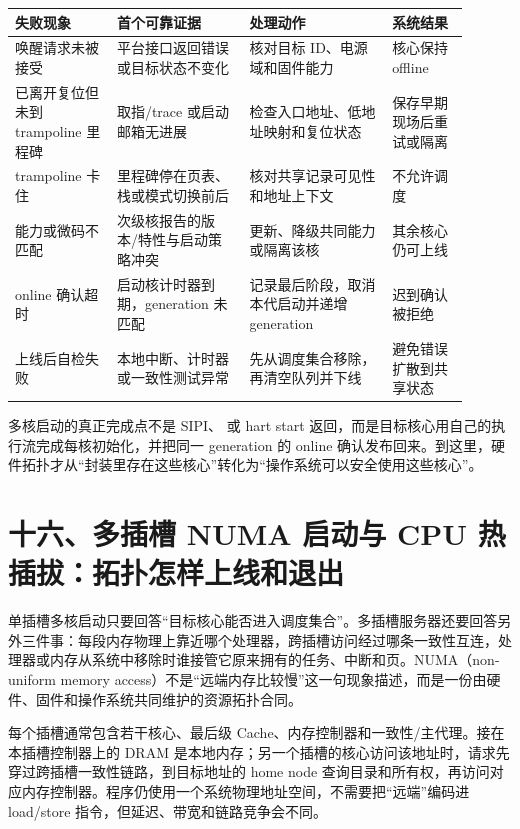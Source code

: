 \begin{longtable}{L{0.20\linewidth}L{0.26\linewidth}L{0.29\linewidth}L{0.15\linewidth}}
\toprule
失败现象 & 首个可靠证据 & 处理动作 & 系统结果 \\
\midrule
唤醒请求未被接受 & 平台接口返回错误或目标状态不变化 & 核对目标 ID、电源域和固件能力 & 核心保持 offline \\\tablerowrule
已离开复位但未到 trampoline 里程碑 & 取指/trace 或启动邮箱无进展 & 检查入口地址、低地址映射和复位状态 & 保存早期现场后重试或隔离 \\\tablerowrule
trampoline 卡住 & 里程碑停在页表、栈或模式切换前后 & 核对共享记录可见性和地址上下文 & 不允许调度 \\\tablerowrule
能力或微码不匹配 & 次级核报告的版本/特性与启动策略冲突 & 更新、降级共同能力或隔离该核 & 其余核心仍可上线 \\\tablerowrule
online 确认超时 & 启动核计时器到期，generation 未匹配 & 记录最后阶段，取消本代启动并递增 generation & 迟到确认被拒绝 \\\tablerowrule
上线后自检失败 & 本地中断、计时器或一致性测试异常 & 先从调度集合移除，再清空队列并下线 & 避免错误扩散到共享状态 \\
\bottomrule
\end{longtable}

多核启动的真正完成点不是 SIPI、 或 hart start 返回，而是目标核心用自己的执行流完成每核初始化，并把同一 generation 的 online 确认发布回来。到这里，硬件拓扑才从“封装里存在这些核心”转化为“操作系统可以安全使用这些核心”。
\section{十六、多插槽 NUMA 启动与 CPU 热插拔：拓扑怎样上线和退出}

单插槽多核启动只要回答“目标核心能否进入调度集合”。多插槽服务器还要回答另外三件事：每段内存物理上靠近哪个处理器，跨插槽访问经过哪条一致性互连，处理器或内存从系统中移除时谁接管它原来拥有的任务、中断和页。NUMA（non-uniform memory access）不是“远端内存比较慢”这一句现象描述，而是一份由硬件、固件和操作系统共同维护的资源拓扑合同。


每个插槽通常包含若干核心、最后级 Cache、内存控制器和一致性/主代理。接在本插槽控制器上的 DRAM 是本地内存；另一个插槽的核心访问该地址时，请求先穿过跨插槽一致性链路，到目标地址的 home node 查询目录和所有权，再访问对应内存控制器。程序仍使用一个系统物理地址空间，不需要把“远端”编码进 load/store 指令，但延迟、带宽和链路竞争会不同。

